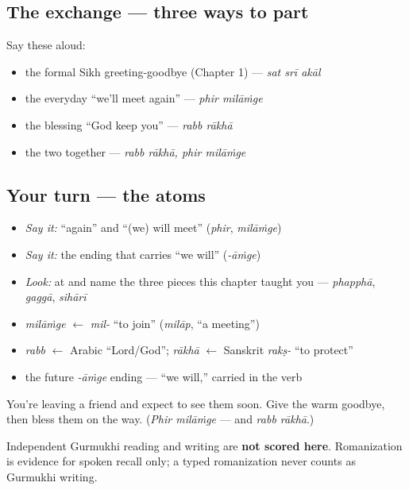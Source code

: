 \subsection*{The exchange — three ways to part}
Say these aloud:

\begin{itemize}
\raggedright
  \item the formal Sikh greeting-goodbye (Chapter 1) — \emph{sat srī akāl}
  \item the everyday \textquotedblleft{}we'll meet again\textquotedblright{} — \emph{phir milāṁge}
  \item the blessing \textquotedblleft{}God keep you\textquotedblright{} — \emph{rabb rākhā}
  \item the two together — \emph{rabb rākhā, phir milāṁge}
\end{itemize}

\subsection*{Your turn — the atoms}
\begin{itemize}
\raggedright
  \item \emph{Say it:} \textquotedblleft{}again\textquotedblright{} and \textquotedblleft{}(we) will meet\textquotedblright{} (\emph{phir}, \emph{milāṁge})
  \item \emph{Say it:} the ending that carries \textquotedblleft{}we will\textquotedblright{} (\emph{-āṁge})
  \item \emph{Look:} at \textbf{} and name the three pieces this chapter taught you — \emph{phapphā}, \emph{gaggā}, \emph{sihārī}
\end{itemize}

\begin{cousinweb}
\begin{itemize}
\raggedright
  \item \emph{milāṁge} $\leftarrow$ \emph{mil-} \textquotedblleft{}to join\textquotedblright{} (\emph{milāp}, \textquotedblleft{}a meeting\textquotedblright{})
  \item \emph{rabb} $\leftarrow$ Arabic \textquotedblleft{}Lord/God\textquotedblright{}; \emph{rākhā} $\leftarrow$ Sanskrit \emph{rakṣ-} \textquotedblleft{}to protect\textquotedblright{}
  \item the future \emph{-āṁge} ending — \textquotedblleft{}we will,\textquotedblright{} carried in the verb
\end{itemize}
\end{cousinweb}

\begin{tcolorbox}[breakable,colback=teal!4,colframe=teal!35!black,title={Before you move on}]
You're leaving a friend and expect to see them soon. Give the warm goodbye, then bless them on the way. (\emph{Phir milāṁge} — and \emph{rabb rākhā}.)

Independent Gurmukhi reading and writing are \textbf{not scored here}. Romanization is evidence for spoken recall only; a typed romanization never counts as Gurmukhi writing.
\end{tcolorbox}
